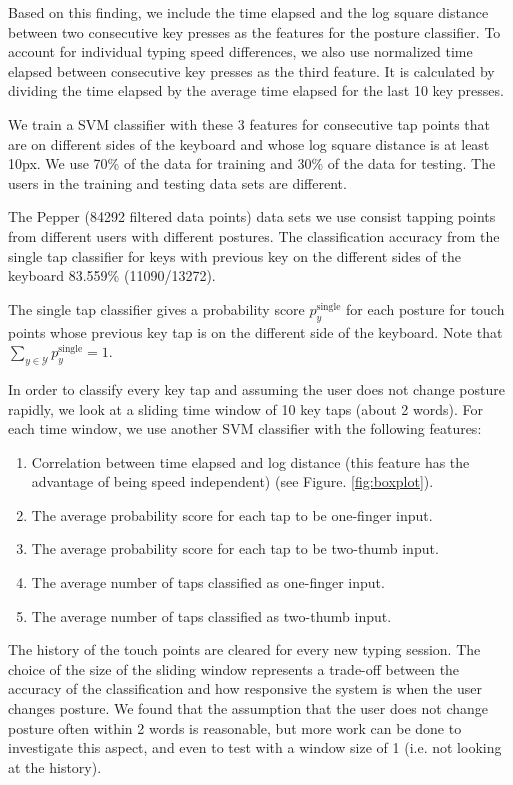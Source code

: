 \documentclass{sigchi}
\begin{document}
Based on this finding, we include the time elapsed and the log square distance
between two consecutive key presses as the features for the posture classifier. 
To account for individual typing speed differences, we also use normalized time 
elapsed between consecutive key presses as the third feature. It is calculated 
by dividing the time elapsed by the average time elapsed for the last 10 key
presses.

We train a SVM classifier with these 3 features for consecutive tap points that 
are on different sides of the keyboard and whose log square distance is at least
10px. We use 70\% of the data for training and 30\% of the
data for testing. The users in the training and testing data sets are different.

The Pepper (84292 filtered data points) data sets we use consist tapping points 
from different users with different postures. The classification accuracy from
the single tap classifier for keys with previous key on the different sides of
the keyboard 83.559\% (11090/13272).

The single tap classifier gives a probability score $p_y^{\text{single}}$ for each posture for touch
points whose previous key tap is on the different side of the keyboard. Note that
$\displaystyle\sum_{y \in \mathcal{Y}}p_y^{\text{single}} = 1$.
 
In order to classify every key tap and assuming the user does not change posture 
rapidly, we look at a sliding time window of 10 key taps (about 2 words). For 
each time window, we use another SVM classifier with the following features:
\begin{enumerate}
\item Correlation between time elapsed and log distance (this feature has the
advantage of being speed independent) (see Figure. \ref{fig:boxplot}).
\item The average probability score for each tap to be one-finger input.
\item The average probability score for each tap to be two-thumb input.
\item The average number of taps classified as one-finger input.
\item The average number of taps classified as two-thumb input.
\end{enumerate}
The history of the touch points are cleared for every new typing session.
The choice of the size of the sliding window represents a trade-off between the 
accuracy of the classification and how responsive the system is when the user
changes posture. We found that the assumption that the user does not change posture
often within 2 words is reasonable, but more work can be done to investigate this
aspect, and even to test with a window size of 1 (i.e. not 
looking at the history).
\end{document}
